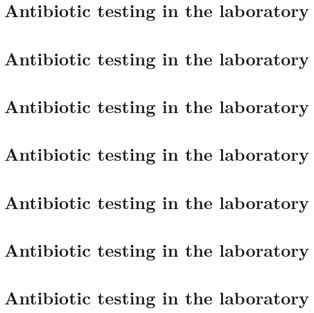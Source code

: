 \documentclass[
  letterpaper,
  DIV=11,
  numbers=noendperiod]{scrreprt}
\begin{document}

\hypertarget{antibiotic-testing-in-the-laboratory-2}{%
\chapter{Antibiotic testing in the
laboratory}\label{antibiotic-testing-in-the-laboratory-2}}


\hypertarget{antibiotic-testing-in-the-laboratory-3}{%
\chapter{Antibiotic testing in the
laboratory}\label{antibiotic-testing-in-the-laboratory-3}}


\hypertarget{antibiotic-testing-in-the-laboratory-4}{%
\chapter{Antibiotic testing in the
laboratory}\label{antibiotic-testing-in-the-laboratory-4}}


\hypertarget{antibiotic-testing-in-the-laboratory-5}{%
\chapter{Antibiotic testing in the
laboratory}\label{antibiotic-testing-in-the-laboratory-5}}


\hypertarget{antibiotic-testing-in-the-laboratory-6}{%
\chapter{Antibiotic testing in the
laboratory}\label{antibiotic-testing-in-the-laboratory-6}}


\hypertarget{antibiotic-testing-in-the-laboratory-7}{%
\chapter{Antibiotic testing in the
laboratory}\label{antibiotic-testing-in-the-laboratory-7}}


\hypertarget{antibiotic-testing-in-the-laboratory-8}{%
\chapter{Antibiotic testing in the
laboratory}\label{antibiotic-testing-in-the-laboratory-8}}
\end{document}
